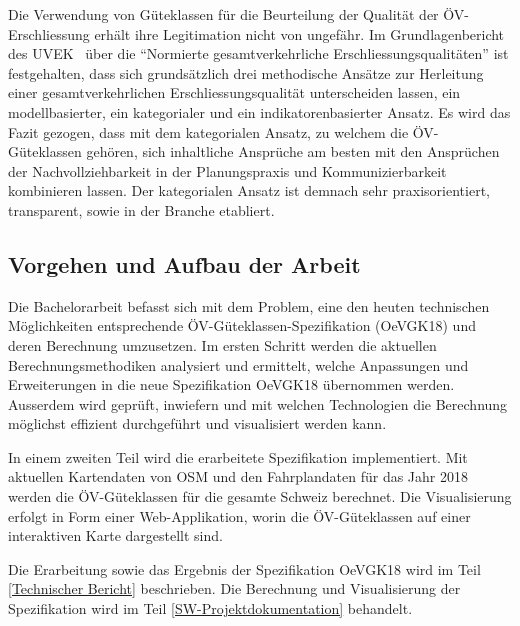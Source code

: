 Die Verwendung von Güteklassen für die Beurteilung der Qualität der \acs{ÖV}-Erschliessung erhält ihre Legitimation nicht von ungefähr.
Im Grundlagenbericht des \acs{UVEK}~\cite{grundlagenbericht_uvek} über die "`Normierte gesamtverkehrliche Erschliessungsqualitäten"' ist festgehalten, dass sich grundsätzlich drei methodische Ansätze zur Herleitung einer gesamtverkehrlichen Erschliessungsqualität unterscheiden lassen, ein modellbasierter, ein kategorialer und ein indikatorenbasierter Ansatz.
Es wird das Fazit gezogen, dass mit dem kategorialen Ansatz, zu welchem die \acs{ÖV}-Güteklassen gehören, sich inhaltliche Ansprüche am besten mit den Ansprüchen der Nachvollziehbarkeit in der Planungspraxis und Kommunizierbarkeit kombinieren lassen.
Der kategorialen Ansatz ist demnach sehr praxisorientiert, transparent, sowie in der Branche etabliert.

\subsection{Vorgehen und Aufbau der Arbeit}
\label{Einführung:Vorgehen und Aufbau der Arbeit}

Die Bachelorarbeit befasst sich mit dem Problem, eine den heuten technischen Möglichkeiten entsprechende \acs{ÖV}-Güteklassen-Spezifikation (\gls{OeVGK18}) und deren Berechnung umzusetzen.
Im ersten Schritt werden die aktuellen Berechnungsmethodiken analysiert und ermittelt, welche Anpassungen und Erweiterungen in die neue Spezifikation \gls{OeVGK18} übernommen werden.
Ausserdem wird geprüft, inwiefern und mit welchen Technologien die Berechnung möglichst effizient durchgeführt und visualisiert werden kann.

In einem zweiten Teil wird die erarbeitete Spezifikation implementiert.
Mit aktuellen Kartendaten von \ac{OSM} und den Fahrplandaten für das Jahr 2018 werden die \acs{ÖV}-Güteklassen für die gesamte Schweiz berechnet.
Die Visualisierung erfolgt in Form einer Web-Applikation, worin die \acs{ÖV}-Güteklassen auf einer interaktiven Karte dargestellt sind.

Die Erarbeitung sowie das Ergebnis der Spezifikation \gls{OeVGK18} wird im Teil \ref{Technischer Bericht} beschrieben.
Die Berechnung und Visualisierung der Spezifikation wird im Teil \ref{SW-Projektdokumentation} behandelt.
